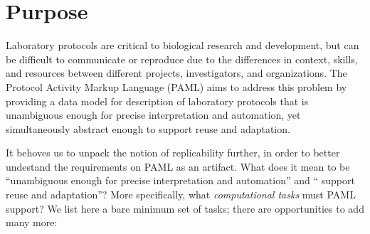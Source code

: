 \section{Purpose}

Laboratory protocols are critical to biological research and development, but can be difficult to communicate or reproduce due to the differences in context, skills, and resources between different projects, investigators, and organizations.
The Protocol Activity Markup Language (PAML) aims to address this problem by providing a data model for description of laboratory protocols that is unambiguous enough for precise interpretation and automation, yet simultaneously abstract enough to support reuse and adaptation.

It behoves us to unpack the notion of replicability further, in order to better undestand the requirements on PAML as an artifact.  What does it mean to be ``unambiguous enough for precise interpretation and automation'' and `` support reuse and adaptation''? More specifically, what \emph{computational tasks} must PAML support?  We list here a bare minimum set of tasks; there are opportunities to add many more:

